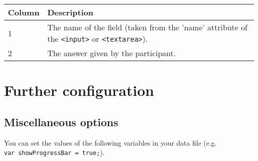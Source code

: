 \documentclass[
]{article}
\begin{document}
\begin{RaggedRight}\small\begin{longtable}[]{p{1.7in}p{4.3in}}
\toprule
\begin{minipage}[b]{0.39\columnwidth}\raggedright
\textbf{Column}\strut
\end{minipage} & \begin{minipage}[b]{0.55\columnwidth}\raggedright
\textbf{Description}\strut
\end{minipage}\tabularnewline
\midrule
\endhead
\begin{minipage}[t]{0.39\columnwidth}\raggedright
1\strut
\end{minipage} & \begin{minipage}[t]{0.55\columnwidth}\raggedright
The name of the field (taken from the 'name' attribute of the
\texttt{\textless{}input\textgreater{}} or
\texttt{\textless{}textarea\textgreater{}}).\strut
\end{minipage}\tabularnewline
\begin{minipage}[t]{0.39\columnwidth}\raggedright
2\strut
\end{minipage} & \begin{minipage}[t]{0.55\columnwidth}\raggedright
The answer given by the participant.\strut
\end{minipage}\tabularnewline
\bottomrule
\end{longtable}\normalsize\end{RaggedRight}

\hypertarget{further-configuration}{%
\section{Further configuration}\label{further-configuration}}

\hypertarget{miscellaneous-options}{%
\subsection{Miscellaneous options}\label{miscellaneous-options}}

You can set the values of the following variables in your data file
(e.g. \texttt{var\ showProgressBar\ =\ true;}).
\end{document}
